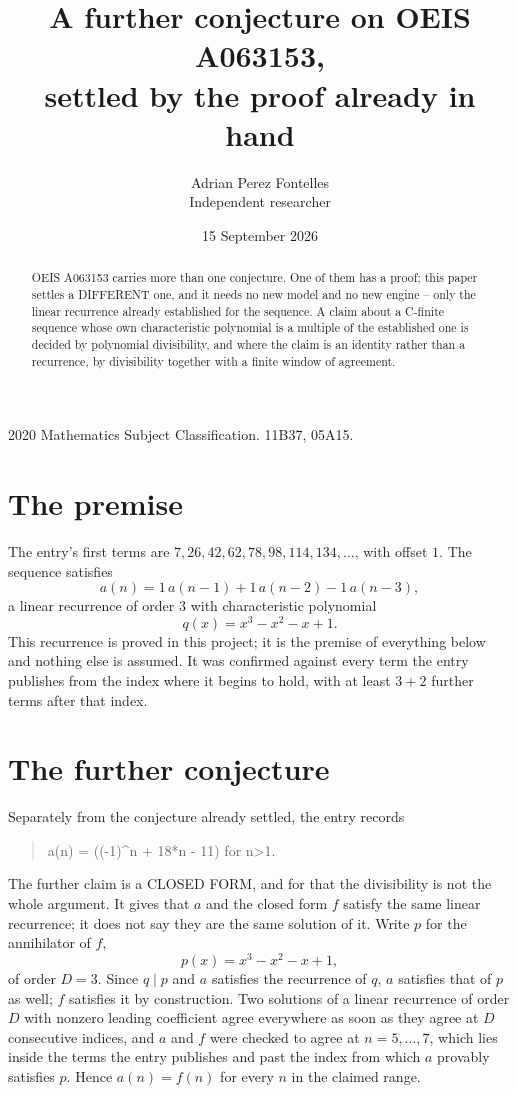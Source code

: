 \documentclass[11pt,a4paper]{article}
\title{A further conjecture on OEIS A063153,\\ \large settled by the proof already in hand}
\author{Adrian Perez Fontelles\\ \small Independent researcher}
\date{15 September 2026}
\theoremstyle{plain}
\theoremstyle{definition}
\begin{document}
\maketitle

\begin{abstract}
OEIS A063153 carries more than one conjecture. One of them has a proof; this paper settles a
DIFFERENT one, and it needs no new model and no new engine -- only the linear recurrence already
established for the sequence. A claim about a C-finite sequence whose own characteristic
polynomial is a multiple of the established one is decided by polynomial divisibility, and where
the claim is an identity rather than a recurrence, by divisibility together with a finite window
of agreement.
\end{abstract}

\noindent\small 2020 Mathematics Subject Classification. 11B37, 05A15.\normalsize

\section{The premise}

The entry's first terms are $7, 26, 42, 62, 78, 98, 114, 134,\dots$, with offset $1$. The sequence satisfies
\[
  a(n)=1\,a(n-1) + 1\,a(n-2) - 1\,a(n-3) ,
\]
a linear recurrence of order $3$ with characteristic polynomial
\[
  q(x)=x^{3} - x^{2} - x + 1 .
\]
This recurrence is proved in this project; it is the premise of everything below and nothing else is assumed.
It was confirmed against every term the entry publishes from the index where it begins to hold,
with at least $3+2$ further terms after that index.

\section{The further conjecture}

Separately from the conjecture already settled, the entry records

\begin{quote}\raggedright a(n) = ((-1)\^{}n + 18*n - 11) for n>1.\end{quote}

The further claim is a CLOSED FORM, and for that the divisibility is not the whole argument. It
gives that $a$ and the closed form $f$ satisfy the same linear recurrence; it does not say they
are the same solution of it. Write $p$ for the annihilator of $f$,
\[
  p(x)=x^{3} - x^{2} - x + 1 ,
\]
of order $D=3$. Since $q\mid p$ and $a$ satisfies the recurrence of $q$, $a$ satisfies that of
$p$ as well; $f$ satisfies it by construction. Two solutions of a linear recurrence of order $D$
with nonzero leading coefficient agree everywhere as soon as they agree at $D$ consecutive
indices, and $a$ and $f$ were checked to agree at $n=5,\dots,7$,
which lies inside the terms the entry publishes and past the index from which $a$ provably
satisfies $p$. Hence $a(n)=f(n)$ for every $n$ in the claimed range.
\end{document}
